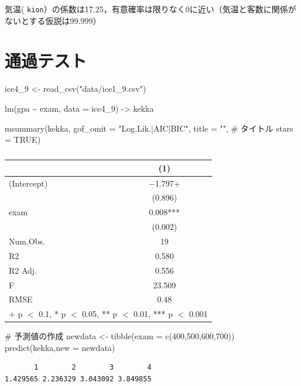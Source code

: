 \documentclass[
  letterpaper,
  DIV=11,
  numbers=noendperiod]{scrreprt}
\newenvironment{Shaded}{\begin{snugshade}}{\end{snugshade}}
\newcommand{\AttributeTok}[1]{\textcolor[rgb]{0.40,0.45,0.13}{#1}}
\newcommand{\CommentTok}[1]{\textcolor[rgb]{0.37,0.37,0.37}{#1}}
\newcommand{\ConstantTok}[1]{\textcolor[rgb]{0.56,0.35,0.01}{#1}}
\newcommand{\DecValTok}[1]{\textcolor[rgb]{0.68,0.00,0.00}{#1}}
\newcommand{\FunctionTok}[1]{\textcolor[rgb]{0.28,0.35,0.67}{#1}}
\newcommand{\NormalTok}[1]{\textcolor[rgb]{0.00,0.23,0.31}{#1}}
\newcommand{\OtherTok}[1]{\textcolor[rgb]{0.00,0.23,0.31}{#1}}
\newcommand{\SpecialCharTok}[1]{\textcolor[rgb]{0.37,0.37,0.37}{#1}}
\newcommand{\StringTok}[1]{\textcolor[rgb]{0.13,0.47,0.30}{#1}}
\begin{document}
気温(
\texttt{kion}）の係数は17.25，有意確率は限りなく0に近い（気温と客数に関係がないとする仮説は99.999）

\hypertarget{ux901aux904eux30c6ux30b9ux30c8}{%
\section{通過テスト}\label{ux901aux904eux30c6ux30b9ux30c8}}

\begin{Shaded}
\begin{Highlighting}[]
\NormalTok{ice4\_9 }\OtherTok{\textless{}{-}} \FunctionTok{read\_csv}\NormalTok{(}\StringTok{"data/ice1\_9.csv"}\NormalTok{)}



\FunctionTok{lm}\NormalTok{(gpa }\SpecialCharTok{\textasciitilde{}}\NormalTok{ exam, }\AttributeTok{data =}\NormalTok{ ice4\_9) }\OtherTok{{-}\textgreater{}}\NormalTok{ kekka}


\FunctionTok{msummary}\NormalTok{(kekka,}
         \AttributeTok{gof\_omit =} \StringTok{"Log.Lik.|AIC|BIC"}\NormalTok{,}
         \AttributeTok{title =} \StringTok{""}\NormalTok{,          }\CommentTok{\# タイトル}
         \AttributeTok{stars =} \ConstantTok{TRUE}\NormalTok{)}
\end{Highlighting}
\end{Shaded}

\begin{table}

\caption{}
\centering
\begin{tabular}[t]{lc}
\toprule
  & (1)\\
\midrule
(Intercept) & \num{-1.797}+\\
 & (\num{0.896})\\
exam & \num{0.008}***\\
 & (\num{0.002})\\
\midrule
Num.Obs. & \num{19}\\
R2 & \num{0.580}\\
R2 Adj. & \num{0.556}\\
F & \num{23.509}\\
RMSE & \num{0.48}\\
\bottomrule
\multicolumn{2}{l}{\rule{0pt}{1em}+ p $<$ 0.1, * p $<$ 0.05, ** p $<$ 0.01, *** p $<$ 0.001}\\
\end{tabular}
\end{table}

\begin{Shaded}
\begin{Highlighting}[]
\CommentTok{\# 予測値の作成}
\NormalTok{newdata }\OtherTok{\textless{}{-}} \FunctionTok{tibble}\NormalTok{(}\AttributeTok{exam =} \FunctionTok{c}\NormalTok{(}\DecValTok{400}\NormalTok{,}\DecValTok{500}\NormalTok{,}\DecValTok{600}\NormalTok{,}\DecValTok{700}\NormalTok{))}
\FunctionTok{predict}\NormalTok{(kekka,}\AttributeTok{new =}\NormalTok{ newdata)}
\end{Highlighting}
\end{Shaded}

\begin{verbatim}
       1        2        3        4 
1.429565 2.236329 3.043092 3.849855 
\end{verbatim}
\end{document}
